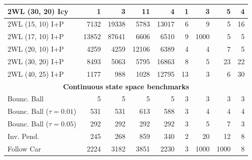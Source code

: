 {\begin{tabular}{|l|rrrr|rrrr|}
\hline
2WL (30, 20) Icy & 1 & 3 & 11 & 4 & 1 & 3 & 5 & 4 \\
\hline
2WL (15, 10) I+P & 7132 & 19338 & 5783 & 13017 & 6 & 9 & 5 & 16 \\
2WL (17, 10) I+P & 13852 & 87641 & 6606 & 6510 & 9 & 1000 & 5 & 5 \\
2WL (20, 10) I+P & 4259 & 4259 & 12106 & 6389 & 4 & 4 & 7 & 5 \\
2WL (30, 20) I+P & 8493 & 5063 & 5795 & 16863 & 8 & 5 & 23 & 22 \\
2WL (40, 25) I+P & 1177 & 988 & 1028 & 12795 & 13 & 3 & 6 & 30 \\
\hline
\multicolumn{9}{|c|}{\textbf{Continuous state space benchmarks}}\\\hline
Bounc. Ball & 5 & 5 & 5 & 5 & 3 & 3 & 3 & 3 \\
Bounc. Ball ($\tau=0.01$) & 531 & 531 & 613 & 588 & 3 & 4 & 4 & 4 \\
Bounc. Ball ($\tau=0.05$) & 292 & 292 & 292 & 292 & 3 & 5 & 7 & 3 \\
\hline
Inv. Pend. & 245 & 268 & 859 & 340 & 2 & 20 & 12 & 8 \\
\hline
Follow Car & 2224 & 3182 & 3851 & 2230 & 3 & 1000 & 1000 & 8 \\
\hline
\end{tabular}}

